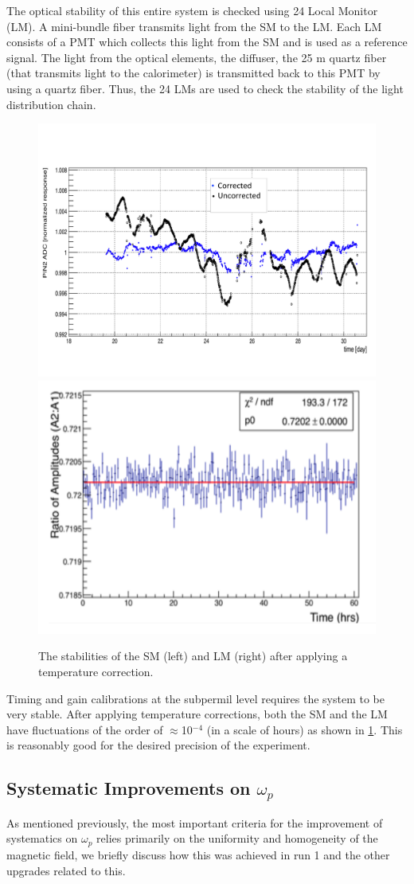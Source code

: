 \documentclass[journal,article,submit,moreauthors,pdftex,10pt,a4paper]{Definitions/mdpi}
\begin{document}
The optical stability of this entire system is checked 
using 24 Local Monitor (LM). A mini-bundle fiber transmits 
light from the SM to the LM. Each LM consists of a PMT 
which collects this light from the SM and is used as a reference signal. 
The light from the optical elements, the diffuser, the 25 m quartz fiber 
(that transmits light to the calorimeter) is transmitted back to this PMT by using a quartz fiber. 
Thus, the 24 LMs are used to check the stability of the light distribution chain. 
\begin{figure}[H]
\centering
\includegraphics[width=7 cm]{SM_satbility.pdf}
\includegraphics[width=7 cm]{LM_stability.pdf}
\caption{\label{fig8}The stabilities of the SM (left) and LM (right) after applying a temperature correction. }
\end{figure} 
Timing and gain calibrations at the subpermil level requires the system to
be very stable. After applying temperature corrections, both the SM and the LM have fluctuations of the 
order of $\approx$10$^{-4}$ (in a scale of hours) as shown in \ref{fig8}. This is reasonably good 
for the desired precision of the experiment. 
\subsection{Systematic Improvements on $\omega_p$}
As mentioned previously, the most important criteria for the improvement of systematics on $\omega_p$ 
relies primarily on the uniformity and homogeneity of the magnetic field, we briefly discuss how 
this was achieved in run 1 and the other upgrades related to this.
\end{document}
